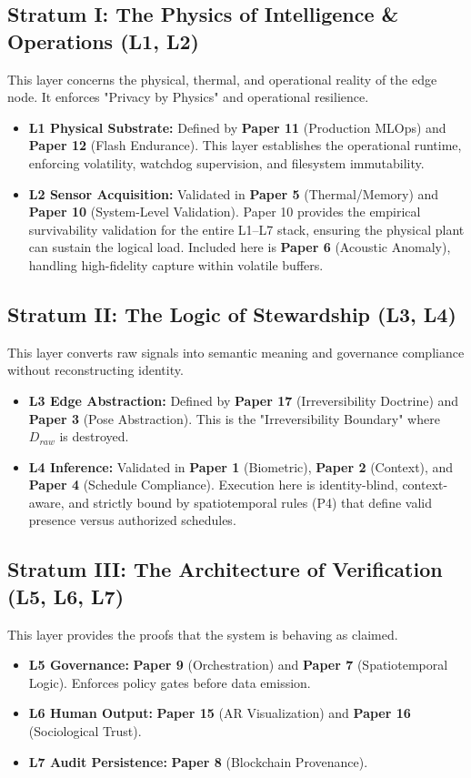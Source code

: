 \documentclass[conference]{IEEEtran}
\theoremstyle{definition}
\begin{document}
\subsection{Stratum I: The Physics of Intelligence \& Operations (L1, L2)}
This layer concerns the physical, thermal, and operational reality of the edge node. It enforces "Privacy by Physics" and operational resilience.
\begin{itemize}
    \item \textbf{L1 Physical Substrate:} Defined by \textbf{Paper 11} (Production MLOps) and \textbf{Paper 12} (Flash Endurance). This layer establishes the operational runtime, enforcing volatility, watchdog supervision, and filesystem immutability.
    \item \textbf{L2 Sensor Acquisition:} Validated in \textbf{Paper 5} (Thermal/Memory) and \textbf{Paper 10} (System-Level Validation). Paper 10 provides the empirical survivability validation for the entire L1–L7 stack, ensuring the physical plant can sustain the logical load. Included here is \textbf{Paper 6} (Acoustic Anomaly), handling high-fidelity capture within volatile buffers.
\end{itemize}

\subsection{Stratum II: The Logic of Stewardship (L3, L4)}
This layer converts raw signals into semantic meaning and governance compliance without reconstructing identity.
\begin{itemize}
    \item \textbf{L3 Edge Abstraction:} Defined by \textbf{Paper 17} (Irreversibility Doctrine) and \textbf{Paper 3} (Pose Abstraction). This is the "Irreversibility Boundary" where $D_{raw}$ is destroyed.
    \item \textbf{L4 Inference:} Validated in \textbf{Paper 1} (Biometric), \textbf{Paper 2} (Context), and \textbf{Paper 4} (Schedule Compliance). Execution here is identity-blind, context-aware, and strictly bound by spatiotemporal rules (P4) that define valid presence versus authorized schedules.
\end{itemize}

\subsection{Stratum III: The Architecture of Verification (L5, L6, L7)}
This layer provides the proofs that the system is behaving as claimed.
\begin{itemize}
    \item \textbf{L5 Governance:} \textbf{Paper 9} (Orchestration) and \textbf{Paper 7} (Spatiotemporal Logic). Enforces policy gates before data emission.
    \item \textbf{L6 Human Output:} \textbf{Paper 15} (AR Visualization) and \textbf{Paper 16} (Sociological Trust).
    \item \textbf{L7 Audit Persistence:} \textbf{Paper 8} (Blockchain Provenance).
\end{itemize}
\end{document}
